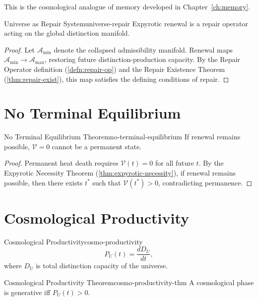 \documentclass[12pt,twoside,openright]{book}
\begin{document}
This is the cosmological analogue of memory developed in
Chapter~\ref{ch:memory}.

\begin{theorem}{Universe as Repair System}{universe-repair}
  Expyrotic renewal is a repair operator acting on the
  global distinction
  manifold.
\end{theorem}

\begin{proof}
  Let $\mathcal{A}_{\min}$ denote the collapsed
  admissibility manifold. Renewal maps
  $\mathcal{A}_{\min} \to \mathcal{A}_{\max}$, restoring
  future distinction-production capacity. By the Repair
  Operator definition (\cref{defn:repair-op}) and the Repair
  Existence Theorem (\cref{thm:repair-exist}), this map
  satisfies the defining conditions of repair.
\end{proof}

\section{No Terminal Equilibrium}
\label{sec:ch19-no-terminal}

\begin{theorem}{No Terminal Equilibrium Theorem}{no-terminal-equilibrium}
  If renewal remains possible, $\mathcal{V} = 0$ cannot be
  a permanent state.
\end{theorem}

\begin{proof}
  Permanent heat death requires $\mathcal{V}(t) = 0$ for all
  future $t$. By the Expyrotic Necessity Theorem
  (\cref{thm:expyrotic-necessity}), if renewal remains
  possible, then there exists $t^*$ such that
  $\mathcal{V}(t^*) > 0$, contradicting permanence.
\end{proof}

\section{Cosmological Productivity}
\label{sec:ch19-productivity}

\begin{definition}{Cosmological Productivity}{cosmo-productivity}
  \[
    P_U(t) = \frac{dD_U}{dt},
  \]
  where $D_U$ is total distinction capacity of the
  universe.
\end{definition}

\begin{theorem}{Cosmological Productivity Theorem}{cosmo-productivity-thm}
  A cosmological phase is generative iff $P_U(t) > 0$.
\end{theorem}
\end{document}
